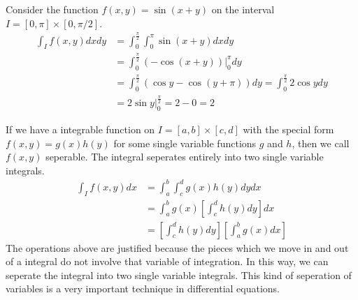 \documentclass[fleqn,letterpaper]{report}
\begin{document}
\begin{example}
Consider the function $f(x,y) = \sin (x+y)$ on the interval $I
= [0, \pi] \times [0, \pi/2]$.
\begin{align*}
\int_I f(x,y) dx dy & = \int_0^{\frac{\pi}{2}} \int_0^{\pi}
\sin (x+y) dx dy \\
& = \int_0^{\frac{\pi}{2}} (-\cos (x+y))
\bigg|_0^{\pi} dy \\
& = \int_0^{\frac{\pi}{2}} (\cos y - \cos (y+\pi)) dy = 
\int_0^{\frac{\pi}{2}} 2 \cos y dy \\
& = 2 \sin y \bigg|_0^{\frac{\pi}{2}} = 2-0 = 2
\end{align*}
\end{example}

\begin{example}
If we have a integrable function on $I = [a,b] \times [c,d]$
with the special form $f(x,y) = g(x) h(y)$ for some single
variable functions $g$ and $h$, then we call $f(x,y)$
seperable. The integral seperates entirely into two single
variable integrals.
\begin{align*}
\int_I f(x,y) dx & = \int_a^b \int_c^d g(x) h(y) dy dx \\
& = \int_a^b g(x) \left[ \int_c^d h(y) dy \right] dx \\
& = \left[ \int_c^d h(y) dy \right] \left[ \int_a^b g(x) dx
\right]
\end{align*}
The operations above are justified because the pieces which we
move in and out of a integral do not involve that variable of
integration. In this way, we can seperate the integral into
two single variable integrals. This kind of seperation of
variables is a very important technique in differential
equations.
\end{example}
\end{document}
